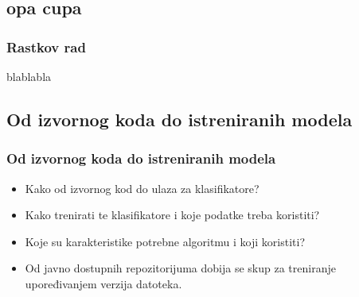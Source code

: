 \documentclass[11pt]{beamer}
\theoremstyle{definition}
\begin{document}
\subsection{opa cupa}
\label{subsec:formalna-verifikacija}
\begin{frame}
\frametitle{Rastkov rad}
blablabla
\end{frame}




\subsection{Od izvornog koda do istreniranih modela}
\label{subsec:WEKA}
\begin{frame}
\frametitle{Od izvornog koda do istreniranih modela}


\begin{itemize}
\item Kako od izvornog kod do ulaza za klasifikatore?
\item Kako trenirati te klasifikatore i koje podatke treba koristiti?
\item Koje su karakteristike potrebne algoritmu i koji koristiti?

\item Od javno dostupnih repozitorijuma dobija se skup za treniranje upoređivanjem verzija datoteka.

\end{itemize}
\end{frame}

{
\begin{frame}
\end{frame}
}
\end{document}
